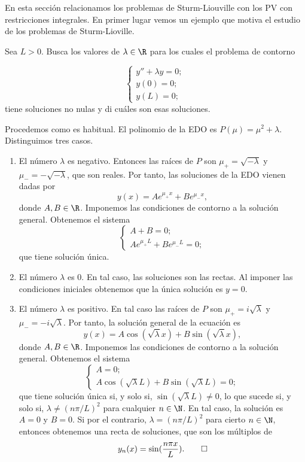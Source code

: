 \documentclass{article}
\begin{document}
En esta sección relacionamos los problemas de Sturm-Liouville con los PV con restricciones
integrales. En primer lugar vemos un ejemplo que motiva el estudio de los problemas de
Sturm-Lioville.

\begin{ex}
  Sea $L > 0$. Busca los valores de $\lambda \in \R$ para los cuales el problema de contorno
  
  \begin{equation}
    \label{eq:ex:sl}
    \begin{cases}
      y'' + \lambda y = 0; \\
      y(0) = 0; \\
      y(L) = 0;
    \end{cases}
  \end{equation}
  tiene soluciones no nulas y di cuáles son esas soluciones.

  Procedemos como es habitual. El polinomio de la EDO es $P(\mu) = \mu^2 + \lambda$.  Distinguimos
  tres casos.
  \begin{enumerate}
  \item El número $\lambda$ es negativo. Entonces las raíces de $P$ son $\mu_+ = \sqrt{-\lambda}$ y
    $\mu_- = -\sqrt{-\lambda}$, que son reales. Por tanto, las soluciones de la EDO vienen dadas por
    \[y(x) = A e^{\mu_+ x} + B e^{\mu_- x},\] donde $A,B \in \R$. Imponemos las condiciones de
    contorno a la solución general. Obtenemos el sistema
    \begin{equation}
      \begin{cases}
        A + B  = 0; \\
        A e^{\mu_+ L} + B e^{\mu_- L} = 0;
      \end{cases}
    \end{equation}
    que tiene solución única.
  \item El número $\lambda$ es $0$. En tal caso, las soluciones son las rectas. Al imponer las
    condiciones iniciales obtenemos que la única solución es $y = 0$.
  \item El número $\lambda$ es positivo. En tal caso las raíces de $P$ son $\mu_+ = i\sqrt{\lambda}$
    y $\mu_- = -i\sqrt{\lambda}$. Por tanto, la solución general de la ecuación es
    \[y(x) = A \cos(\sqrt{\lambda}x) + B \sin(\sqrt{\lambda} x),\] donde $A,B \in \R$. Imponemos las
    condiciones de contorno a la solución general. Obtenemos el sistema
    \begin{equation}
      \begin{cases}
        A  = 0; \\
        A \cos(\sqrt{\lambda}L) + B \sin(\sqrt{\lambda}L) = 0;
      \end{cases}
    \end{equation}
    que tiene solución única si, y solo si, $\sin(\sqrt{\lambda}L) \ne 0$, lo que sucede si, y solo
    si, $\lambda \ne (n \pi / L)^2$ para cualquier $n \in \N$. En tal caso, la solución es $A = 0$ y
    $B = 0$. Si por el contrario, $\lambda = (n \pi / L)^2$ para cierto $n \in \N$, entonces
    obtenemos una recta de soluciones, que son los múltiplos de
    \[y_n(x) = \sin(\frac{n \pi x}{L}). \qedhere\]
  \end{enumerate}
\end{ex}
\end{document}

